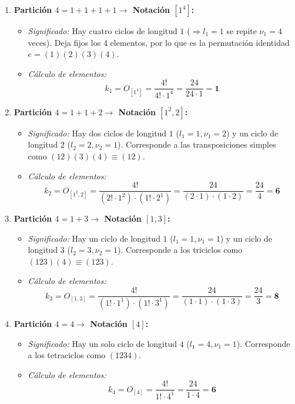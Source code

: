 \documentclass[11pt, a4paper]{article}
\begin{document}
\begin{enumerate}
    \item \textbf{Partición $4 = 1 + 1 + 1 + 1 \longrightarrow$ Notación $[1^4]$:}
    \begin{itemize}
        \item \textit{Significado:} Hay cuatro ciclos de longitud $1$ ($\Rightarrow l_1 = 1$ se repite $\nu_1 = 4$ veces). Deja fijos los 4 elementos, por lo que es la permutación identidad $e = (1)(2)(3)(4)$.
        \item \textit{Cálculo de elementos:}
        \[
        k_1 = O_{[1^4]} = \frac{4!}{4! \cdot 1^4} = \frac{24}{24 \cdot 1} = \mathbf{1}
        \]
    \end{itemize}

    \item \textbf{Partición $4 = 1 + 1 + 2 \longrightarrow$ Notación $[1^2, 2]$:}
    \begin{itemize}
        \item \textit{Significado:} Hay dos ciclos de longitud $1$ ($l_1 = 1, \nu_1 = 2$) y un ciclo de longitud $2$ ($l_2 = 2, \nu_2 = 1$). Corresponde a las transposiciones simples como $(12)(3)(4) \equiv (12)$.
        \item \textit{Cálculo de elementos:}
        \[
        k_2 = O_{[1^2, 2]} = \frac{4!}{(2! \cdot 1^2) \cdot (1! \cdot 2^1)} = \frac{24}{(2 \cdot 1) \cdot (1 \cdot 2)} = \frac{24}{4} = \mathbf{6}
        \]
    \end{itemize}

    \item \textbf{Partición $4 = 1 + 3 \longrightarrow$ Notación $[1, 3]$:}
    \begin{itemize}
        \item \textit{Significado:} Hay un ciclo de longitud $1$ ($l_1 = 1, \nu_1 = 1$) y un ciclo de longitud $3$ ($l_2 = 3, \nu_2 = 1$). Corresponde a los triciclos como $(123)(4) \equiv (123)$.
        \item \textit{Cálculo de elementos:}
        \[
        k_3 = O_{[1, 3]} = \frac{4!}{(1! \cdot 1^1) \cdot (1! \cdot 3^1)} = \frac{24}{(1 \cdot 1) \cdot (1 \cdot 3)} = \frac{24}{3} = \mathbf{8}
        \]
    \end{itemize}

    \item \textbf{Partición $4 = 4 \longrightarrow$ Notación $[4]$:}
    \begin{itemize}
        \item \textit{Significado:} Hay un solo ciclo de longitud $4$ ($l_1 = 4, \nu_1 = 1$). Corresponde a los tetraciclos como $(1234)$.
        \item \textit{Cálculo de elementos:}
        \[
        k_4 = O_{[4]} = \frac{4!}{1! \cdot 4^1} = \frac{24}{1 \cdot 4} = \mathbf{6}
        \]
    \end{itemize}


\end{enumerate}
\end{document}
